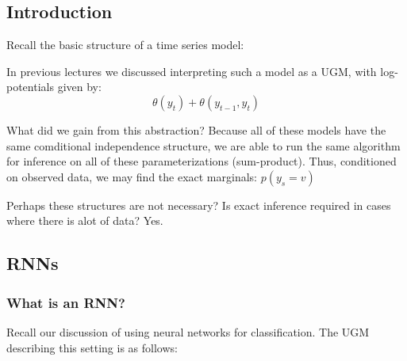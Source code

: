 \documentclass{article}
\begin{document}

\subsection{Introduction}
Recall the basic structure of a time series model:
\smallskip

\begin{center}
\end{center}

In previous lectures we discussed interpreting such a model as a UGM, with log-potentials given by:
$$\theta(y_{t}) + \theta(y_{t-1},y_{t})$$

What did we gain from this abstraction? Because all of these models have the same comditional independence structure, we are able to run the same algorithm for inference on all of these parameterizations (sum-product). Thus, conditioned on observed data, we may find the exact marginals: $p(y_{s}=v)$
\smallskip

Perhaps these structures are not necessary? Is exact inference required in cases where there is alot of data? Yes.

\subsection{RNNs}
\subsubsection{What is an RNN?}
Recall our discussion of using neural networks for classification. The UGM describing this setting is as follows:

\begin{center}
\end{center}
\end{document}
